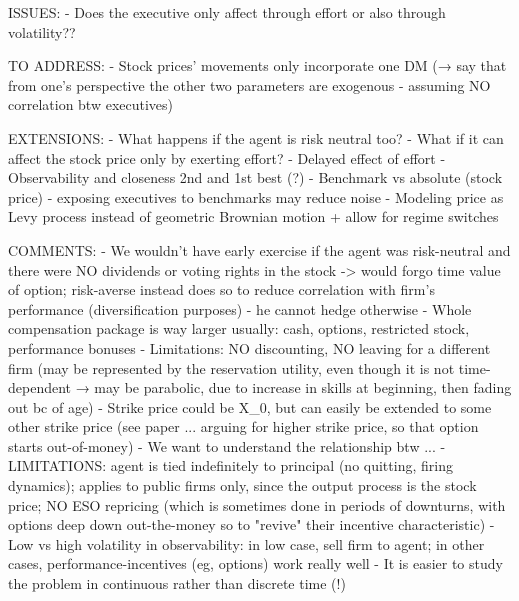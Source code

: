ISSUES:
- Does the executive only affect through effort or also through volatility??






TO ADDRESS:
- Stock prices' movements only incorporate one DM (→ say that from one's perspective the other two parameters are exogenous - assuming NO correlation btw executives) 


EXTENSIONS:
- What happens if the agent is risk neutral too?
- What if it can affect the stock price only by exerting effort?
- Delayed effect of effort
- Observability and closeness 2nd and 1st best (?)
- Benchmark vs absolute (stock price) - exposing executives to benchmarks may reduce noise
- Modeling price as Levy process instead of geometric Brownian motion + allow for regime switches


COMMENTS:
- We wouldn't have early exercise if the agent was risk-neutral and there were NO dividends or voting rights in the stock -> would forgo time value of option; risk-averse instead does so to reduce correlation with firm's performance (diversification purposes) - he cannot hedge otherwise
- Whole compensation package is way larger usually: cash, options, restricted stock, performance bonuses
- Limitations: NO discounting, NO leaving for a different firm (may be represented by the reservation utility, even though it is not time-dependent → may be parabolic, due to increase in skills at beginning, then fading out bc of age)
- Strike price could be X_0, but can easily be extended to some other strike price (see paper ... arguing for higher strike price, so that option starts out-of-money)
- We want to understand the relationship btw ...
- LIMITATIONS: agent is tied indefinitely to principal (no quitting, firing dynamics); applies to public firms only, since the output process is the stock price; NO ESO repricing (which is sometimes done in periods of downturns, with options deep down out-the-money so to "revive" their incentive characteristic)
- Low vs high volatility in observability: in low case, sell firm to agent; in other cases, performance-incentives (eg, options) work really well
- It is easier to study the problem in continuous rather than discrete time (!)